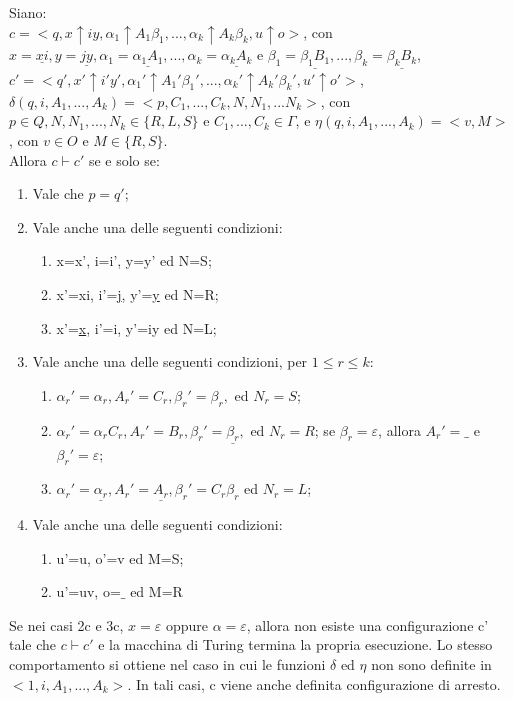   \begin{definition}
    Siano:\\
    \(c=<q, x\!\uparrow\! iy, \alpha_1\!\uparrow\! A_1\beta_1,...,\alpha_k \!\uparrow\! A_k \beta_k, u \!\uparrow\! o>\), con \(x=\underline{xi}, y=\underline{jy}, \alpha_1=\underline{\alpha_1A_1},...,\alpha_k=\underline{\alpha_kA_k}\) e \(\beta_1=\underline{\beta_1B_1},..., \beta_k=\underline{\beta_kB_k}\),\;
    \(c'=<q', x' \!\uparrow\! i'y', \alpha_1' \!\uparrow\! A_1' \beta_1',..., \alpha_k' \!\uparrow\! A_k' \beta_k', u' \!\uparrow\! o'>\), \\ 
    \(\delta(q,i,A_1, ..., A_k) = <p, C_1, ..., C_k, N,N_1,...N_k>\), con \(p \in Q, N, N_1, ..., N_k \in \{R,L,S\}\) e \(C_1,...,C_k\in\Gamma\), e \(\eta(q,i,A_1,...,A_k) = <v,M>\), con \(v\in O\) e \(M\in\{R,S\}\).
    \\ Allora \(c\vdash c'\) se e solo se:
    \begin{enumerate}
      \item Vale che \(p=q'\);
      \item Vale anche una delle seguenti condizioni:
      \begin{enumerate}
        \item x=x', i=i', y=y' ed N=S;
        \item x'=xi, i'=\underline{j}, y'=\underline{y} ed N=R;
        \item x'=\underline{x}, i'=i, y'=iy ed N=L;
      \end{enumerate}
      \item Vale anche una delle seguenti condizioni, per \(1\leq r\leq k\):
      \begin{enumerate}
        \item \(\alpha_r'=\alpha_r, A_r'=C_r, \beta_r'=\beta_r,\) ed \(N_r=S\);
        \item \(\alpha_r'=\alpha_rC_r, A_r'=B_r,\beta_r'=\underline{\beta_r},\) ed \(N_r=R\); se \(\beta_r=\varepsilon\), allora \(A_r'=\_\) e \(\beta_r'=\varepsilon\);
        \item \(\alpha_r'=\underline{\alpha_r}, A_r'=\underline{A_r}, \beta_r'=C_r\beta_r\) ed \(N_r=L\);
      \end{enumerate}
      \item Vale anche una delle seguenti condizioni:
      \begin{enumerate}
        \item u'=u, o'=v ed M=S;
        \item u'=uv, o=\(\_\) ed M=R
      \end{enumerate}      
    \end{enumerate}

    Se nei casi 2c e 3c, \(x=\varepsilon\) oppure \(\alpha=\varepsilon\), allora non esiste una configurazione c' tale che \(c\vdash c'\) e la macchina di Turing termina la propria esecuzione. Lo stesso comportamento si ottiene nel caso in cui le funzioni \(\delta\) ed \(\eta\) non sono definite in \(<1,i,A_1,...,A_k>\). In tali casi, c viene anche definita configurazione di arresto.
  \end{definition}

